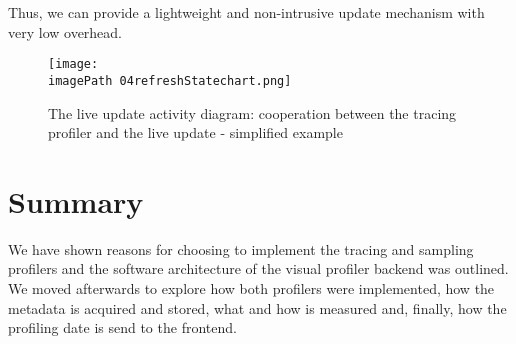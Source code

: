 Thus, we can provide a lightweight and non-intrusive update mechanism with very low overhead. 

\begin{figure}
	\centering
		\texttt{[image: \\imagePath 04refreshStatechart.png]}
		\caption{The live update activity diagram: cooperation between the tracing profiler and the live update  - simplified example }
	\label{fig:04refreshStatechart}
\end{figure}

 
\section{Summary}
We have shown reasons for choosing to implement the tracing and sampling profilers and the software architecture of the visual profiler backend was outlined. We moved afterwards to explore how both profilers were implemented, how the metadata is acquired and stored, what and how is measured and, finally, how the profiling date is send to the frontend.







